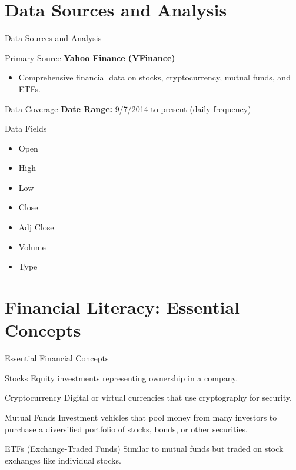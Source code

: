\documentclass{beamer}
\begin{document}
\section{Data Sources and Analysis}
\begin{frame}{Data Sources and Analysis}
    \begin{block}{Primary Source}
        \textbf{Yahoo Finance (YFinance)}
        \begin{itemize}
            \item Comprehensive financial data on stocks, cryptocurrency, mutual funds, and ETFs.
        \end{itemize}
    \end{block}
    \begin{block}{Data Coverage}
        \textbf{Date Range:} 9/7/2014 to present (daily frequency)
    \end{block}
    \begin{block}{Data Fields}
        \begin{multicols}{2}
        \begin{itemize}
            \item Open
            \item High
            \item Low
            \item Close
            \item Adj Close
            \item Volume
            \item Type
        \end{itemize}
        \end{multicols}
    \end{block}
\end{frame}



\section{Financial Literacy: Essential Concepts}
\begin{frame}{Essential Financial Concepts}
    \begin{block}{Stocks}
        Equity investments representing ownership in a company.
    \end{block}
    \begin{block}{Cryptocurrency}
        Digital or virtual currencies that use cryptography for security.
    \end{block}
    \begin{block}{Mutual Funds}
        Investment vehicles that pool money from many investors to purchase a diversified portfolio of stocks, bonds, or other securities.
    \end{block}
    \begin{block}{ETFs (Exchange-Traded Funds)}
        Similar to mutual funds but traded on stock exchanges like individual stocks.
    \end{block}
\end{frame}
\end{document}
